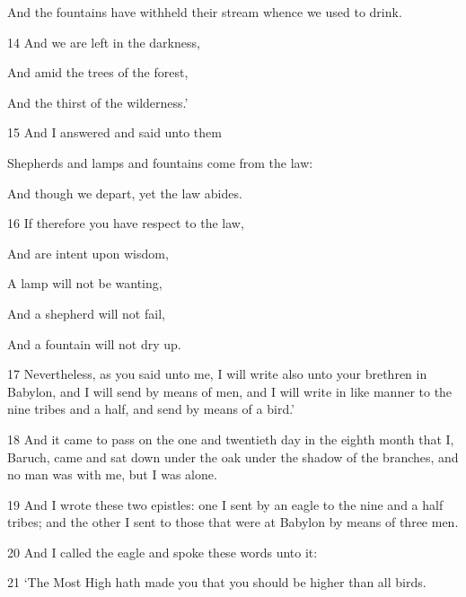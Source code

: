 \par And the fountains have withheld their stream whence we used to drink.

\par 14 And we are left in the darkness,

\par And amid the trees of the forest,

\par And the thirst of the wilderness.’

\par 15 And I answered and said unto them

\par Shepherds and lamps and fountains come from the law:

\par And though we depart, yet the law abides.

\par 16 If therefore you have respect to the law,

\par And are intent upon wisdom,

\par A lamp will not be wanting,

\par And a shepherd will not fail,

\par And a fountain will not dry up.

\par 17 Nevertheless, as you said unto me, I will write also unto your brethren in Babylon, and I will send by means of men, and I will write in like manner to the nine tribes and a half, and send by means of a bird.' 

\par 18 And it came to pass on the one and twentieth day in the eighth month that I, Baruch, came and sat down under the oak under the shadow of the branches, and no man was with me, but I was alone. 

\par 19 And I wrote these two epistles: one I sent by an eagle to the nine and a half tribes; and the other I sent to those that were at Babylon by means of three men. 

\par 20 And I called the eagle and spoke these words unto it: 

\par 21 ‘The Most High hath made you that you should be higher than all birds. 

